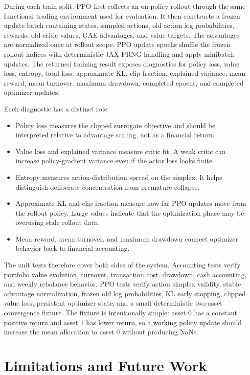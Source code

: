 \documentclass[11pt]{article}
\newcommand{\1}{\mathbf{1}}
\begin{document}
During each train split, PPO first collects an on-policy rollout through the
same functional trading environment used for evaluation. It then constructs a
frozen update batch containing states, sampled actions, old action log
probabilities, rewards, old critic values, GAE advantages, and value targets.
The advantages are normalized once at rollout scope. PPO update epochs shuffle
the frozen rollout indices with deterministic JAX PRNG handling and apply
minibatch updates. The returned training result exposes diagnostics for policy
loss, value loss, entropy, total loss, approximate KL, clip fraction, explained
variance, mean reward, mean turnover, maximum drawdown, completed epochs, and
completed optimizer updates.

Each diagnostic has a distinct role:
\begin{itemize}[leftmargin=*]
  \item Policy loss measures the clipped surrogate objective and should be
  interpreted relative to advantage scaling, not as a financial return.
  \item Value loss and explained variance measure critic fit. A weak critic can
  increase policy-gradient variance even if the actor loss looks finite.
  \item Entropy measures action-distribution spread on the simplex. It helps
  distinguish deliberate concentration from premature collapse.
  \item Approximate KL and clip fraction measure how far PPO updates move from
  the rollout policy. Large values indicate that the optimization phase may be
  overusing stale rollout data.
  \item Mean reward, mean turnover, and maximum drawdown connect optimizer
  behavior back to financial accounting.
\end{itemize}

The unit tests therefore cover both sides of the system. Accounting tests verify
portfolio value evolution, turnover, transaction cost, drawdown, cash
accounting, and weekly rebalance behavior. PPO tests verify action simplex
validity, stable advantage normalization, frozen old log probabilities, KL
early stopping, clipped value loss, persistent optimizer state, and a small
deterministic two-asset convergence fixture. The fixture is intentionally
simple: asset $0$ has a constant positive return and asset $1$ has lower
return, so a working policy update should increase the mean allocation to asset
$0$ without producing NaNs.

\section{Limitations and Future Work}
\end{document}
